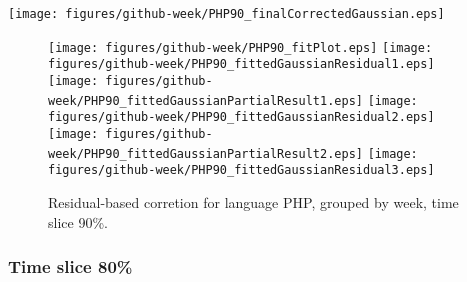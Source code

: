 \begin{center}
{\texttt{[image: figures/github-week/PHP90\_finalCorrectedGaussian.eps]}}
\end{center}

\FloatBarrier

\begin{figure}[t]
\centering
{}
{\texttt{[image: figures/github-week/PHP90\_fitPlot.eps]}}
{\texttt{[image: figures/github-week/PHP90\_fittedGaussianResidual1.eps]}}
{\texttt{[image: figures/github-week/PHP90\_fittedGaussianPartialResult1.eps]}}
{\texttt{[image: figures/github-week/PHP90\_fittedGaussianResidual2.eps]}}
{\texttt{[image: figures/github-week/PHP90\_fittedGaussianPartialResult2.eps]}}
{\texttt{[image: figures/github-week/PHP90\_fittedGaussianResidual3.eps]}}
\caption{Residual-based corretion for language PHP, grouped by week, time slice 90\%.}
\end{figure}


\FloatBarrier


\subsubsection{Time slice 80\%}

